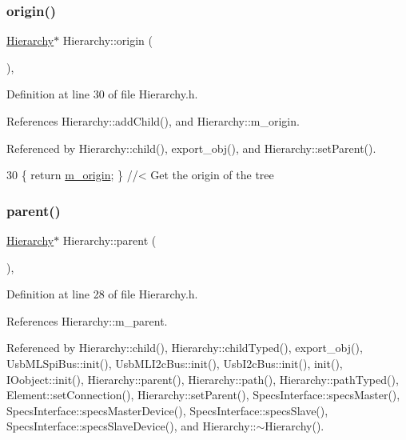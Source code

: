 \subsubsection{\texorpdfstring{origin()}{origin()}}
{\footnotesize\ttfamily \hyperlink{classHierarchy}{Hierarchy}$\ast$ Hierarchy\+::origin (\begin{DoxyParamCaption}{ }\end{DoxyParamCaption})\hspace{0.3cm}{\ttfamily [inline]}, {\ttfamily [inherited]}}



Definition at line 30 of file Hierarchy.\+h.



References Hierarchy\+::add\+Child(), and Hierarchy\+::m\+\_\+origin.



Referenced by Hierarchy\+::child(), export\+\_\+obj(), and Hierarchy\+::set\+Parent().


\begin{DoxyCode}
30 \{ \textcolor{keywordflow}{return} \hyperlink{classHierarchy_a16c73e557d3a7c156ffb5dc4102d148e}{m\_origin}; \}  \textcolor{comment}{//< Get the origin of the tree}
\end{DoxyCode}
\mbox{\label{classHierarchy_a1c7bec8257e717f9c1465e06ebf845fc}} 
\subsubsection{\texorpdfstring{parent()}{parent()}\hspace{0.1cm}{\footnotesize\ttfamily [1/2]}}
{\footnotesize\ttfamily \hyperlink{classHierarchy}{Hierarchy}$\ast$ Hierarchy\+::parent (\begin{DoxyParamCaption}{ }\end{DoxyParamCaption})\hspace{0.3cm}{\ttfamily [inline]}, {\ttfamily [inherited]}}



Definition at line 28 of file Hierarchy.\+h.



References Hierarchy\+::m\+\_\+parent.



Referenced by Hierarchy\+::child(), Hierarchy\+::child\+Typed(), export\+\_\+obj(), Usb\+M\+L\+Spi\+Bus\+::init(), Usb\+M\+L\+I2c\+Bus\+::init(), Usb\+I2c\+Bus\+::init(), init(), I\+Oobject\+::init(), Hierarchy\+::parent(), Hierarchy\+::path(), Hierarchy\+::path\+Typed(), Element\+::set\+Connection(), Hierarchy\+::set\+Parent(), Specs\+Interface\+::specs\+Master(), Specs\+Interface\+::specs\+Master\+Device(), Specs\+Interface\+::specs\+Slave(), Specs\+Interface\+::specs\+Slave\+Device(), and Hierarchy\+::$\sim$\+Hierarchy().


